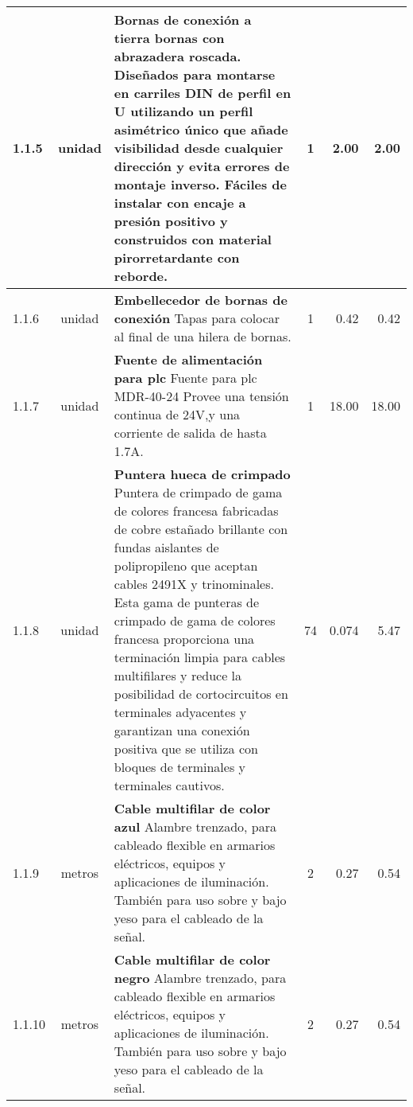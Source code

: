 \begin{longtable}{l c p{7cm} c r r}
    1.1.5 & unidad & \textbf{Bornas de conexión a tierra} \newline \small bornas con abrazadera roscada. Diseñados para montarse en carriles DIN de perfil en U utilizando un perfil asimétrico único que añade visibilidad desde cualquier dirección y evita errores de montaje inverso. Fáciles de instalar con encaje a presión positivo y construidos con material pirorretardante con reborde. & 1 & 2.00 & 2.00  \\ \hline
    
    1.1.6 & unidad & \textbf{Embellecedor de bornas de conexión} \newline \small Tapas para colocar al final de una hilera de bornas. & 1 & 0.42 & 0.42  \\ \hline 
    
    1.1.7 & unidad & \textbf{Fuente de alimentación para plc} \newline \small Fuente para plc MDR-40-24 Provee una tensión continua de 24V,y una corriente de salida de hasta 1.7A. & 1 & 18.00 & 18.00\\ \hline 

    1.1.8 & unidad & \textbf{Puntera hueca de crimpado} \newline \small Puntera de crimpado de gama de colores francesa fabricadas de cobre estañado brillante con fundas aislantes de polipropileno que aceptan cables 2491X y trinominales. Esta gama de punteras de crimpado de gama de colores francesa proporciona una terminación limpia para cables multifilares y reduce la posibilidad de cortocircuitos en terminales adyacentes y garantizan una conexión positiva que se utiliza con bloques de terminales y terminales cautivos. & 74 & 0.074 & 5.47  \\ \hline

    1.1.9 & metros & \textbf{Cable multifilar de color azul} Alambre trenzado, para cableado flexible en armarios eléctricos, equipos y aplicaciones de iluminación. También para uso sobre y bajo yeso para el cableado de la señal. \newline \small & 2 & 0.27 & 0.54  \\ \hline

    1.1.10 & metros & \textbf{Cable multifilar de color negro} Alambre trenzado, para cableado flexible en armarios eléctricos, equipos y aplicaciones de iluminación. También para uso sobre y bajo yeso para el cableado de la señal. \newline \small & 2 & 0.27 & 0.54  \\ \hline
   

\end{longtable}
